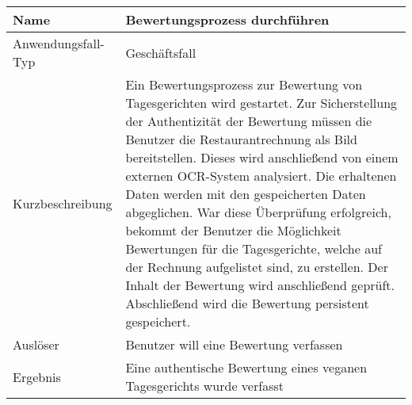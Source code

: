 \begin{table}[H]
    \centering
    \label{bewertungsprozessDurchfuehren}
    \begin{tabularx}{\textwidth}{| l | X |}
        \hline
        Name               & Bewertungsprozess durchführen                                                                                                                                                                                                                                                                                                                                                                                                                       \\
        \hline
        Anwendungsfall-Typ & Geschäftsfall                                                                                                                                                                                                                                                                                                                                                                                                                                       \\
        \hline
        Kurzbeschreibung   & Ein Bewertungsprozess zur Bewertung von Tagesgerichten wird gestartet. Zur Sicherstellung der Authentizität der Bewertung müssen die Benutzer die Restaurantrechnung als Bild bereitstellen. Dieses wird anschließend von einem externen OCR-System analysiert. Die erhaltenen Daten werden mit den gespeicherten Daten abgeglichen. War diese Überprüfung erfolgreich, bekommt der Benutzer die Möglichkeit Bewertungen für die Tagesgerichte, welche auf der Rechnung aufgelistet sind, zu erstellen. Der Inhalt der Bewertung wird anschließend geprüft. Abschließend wird die Bewertung persistent gespeichert. \\
        \hline
        Auslöser           & Benutzer will eine Bewertung verfassen                                                                                                                                                                                                                                                                                                                                                                                                              \\
        \hline
        Ergebnis           & Eine authentische Bewertung eines veganen Tagesgerichts wurde verfasst                                                                                                                                                                                                                                                                                                                                                                              \\

\end{tabularx}
\end{table}
